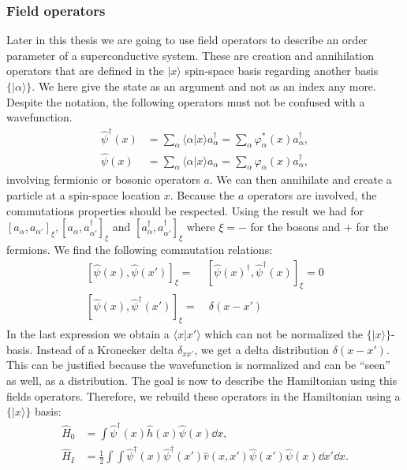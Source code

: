 \documentclass[../main.tex]{subfile}
\begin{document}
\subsubsection{Field operators}
Later in this thesis we are going to use field operators to describe an order parameter of a superconductive system. These are 
creation and annihilation operators that are defined in the $|x\rangle$ spin-space basis regarding another basis $\{|\alpha\rangle\}$. We here give the state as an argument
and not as an index any more. Despite the notation, the following operators must not be confused with a wavefunction.
\begin{align}
    \hat{\psi}^{\dagger}(x) &= \sum_{\alpha} \langle\alpha|x\rangle a_{\alpha}^{\dagger} = \sum_{\alpha} \varphi_{\alpha}^{\ast}(x) a_{\alpha}^{\dagger}, \label{eq:FieldOp}\\ 
    \hat{\psi}(x) &= \sum_{\alpha} \langle\alpha|x\rangle a_{\alpha} = \sum_{\alpha} \varphi_{\alpha}(x) a_{\alpha}^{\dagger},\label{eq:FieldOpDag}
\end{align}
involving fermionic or bosonic operators $a$. We can then annihilate and create a particle at a spin-space location $x$. Because the $a$ operators
are involved, the commutations properties should be respected. Using the result we had for $[a_{\alpha}, a_{\alpha'}]_{\xi},
[a_{\alpha}, a_{\alpha'}^{\dagger}]_{\xi}$ and $[a_{\alpha}^{\dagger}, a_{\alpha'}^{\dagger}]_{\xi}$ where $\xi = -$ for the bosons and $+$ for the fermions. We find the following commutation relations:
\begin{align*}
    \left[\hat{\psi}(x), \hat{\psi}(x')\right]_{\xi} = & \left[\hat{\psi}(x)^{\dagger}, \hat{\psi}^{\dagger}(x)\right]_{\xi} = 0 \\
    \left[\hat{\psi}(x), \hat{\psi}^{\dagger}(x')\right]_{\xi} = &~ \delta(x-x')
\end{align*}
In the last expression we obtain a $\langle x | x '\rangle$ which can not be normalized the $\{|x\rangle\}$-basis. Instead of a Kronecker delta $\delta_{xx'}$,
we get a delta distribution $\delta(x-x')$. This can be justified because the wavefunction is normalized and can be ``seen'' as well, as a distribution.
The goal is now to describe the Hamiltonian using this fields operators. Therefore, we rebuild these operators in the Hamiltonian using a $\{|x\rangle\}$ basis:
\begin{align*}
    \hat{H}_0 &=  \int \hat{\psi}^{\dagger}(x) \hat{h}(x)\hat{\psi}(x) \dd x,\\
    \hat{H}_I &= \frac{1}{2} \int \int  \hat{\psi}^{\dagger}(x) \hat{\psi}^{\dagger}(x') \hat{v}(x,x')\hat{\psi}(x') \hat{\psi}(x) \dd x' \dd x.
\end{align*}
\end{document}
